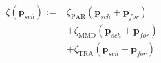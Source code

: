 \begin{equation}
\begin{split}
	\zeta(\textbf{p}_{sch}) := &\zeta_\text{PAR}(\textbf{p}_{sch}+	\textbf{p}_{for})\\
	&+ \zeta_\text{MMD}(\textbf{p}_{sch}+\textbf{p}_{for})\\
	&+ \zeta_\text{TRA}(\textbf{p}_{sch}+\textbf{p}_{for})
\end{split}
\label{ch2:equ:cost-global}
\end{equation}